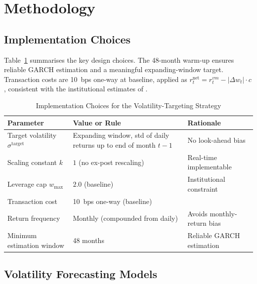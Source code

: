 \documentclass[12pt, a4paper]{article}
\newcommand{\stgt}{\sigma^{\mathrm{target}}}
\begin{document}
\section{Methodology}

\subsection{Implementation Choices}

Table~\ref{tab:implchoices} summarises the key design choices. The 48-month warm-up
ensures reliable GARCH estimation and a meaningful expanding-window target. Transaction
costs are 10~bps one-way at baseline, applied as $r^{\mathrm{net}}_t = r^{vm}_t - |\Delta w_t|\cdot c$,
consistent with the institutional estimates of \citet{frazzini2018}.

\begin{table}[H]
\centering
\small
\caption{Implementation Choices for the Volatility-Targeting Strategy}
\label{tab:implchoices}
\begin{tabularx}{\textwidth}{llX}
\toprule
\textbf{Parameter} & \textbf{Value or Rule} & \textbf{Rationale}\\
\midrule
Target volatility $\stgt$ & Expanding window, std of daily returns up to end of month $t-1$ & No look-ahead bias \citep{bongaerts2020}\\
Scaling constant $k$    & $1$ (no ex-post rescaling)                & Real-time implementable\\
Leverage cap $w_{\max}$ & $2.0$ (baseline)                          & Institutional constraint\\
Transaction cost        & 10~bps one-way (baseline)                 & \citet{frazzini2018}\\
Return frequency        & Monthly (compounded from daily)           & Avoids monthly-return bias\\
Minimum estimation window & 48 months                               & Reliable GARCH estimation\\
\bottomrule
\end{tabularx}
\end{table}

\subsection{Volatility Forecasting Models}
\end{document}
